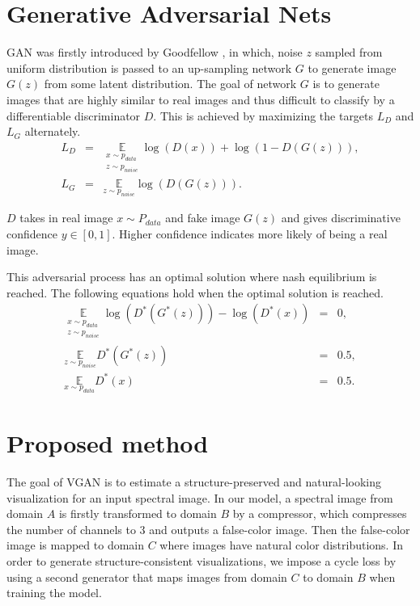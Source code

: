 \documentclass[10pt,conference,a4paper]{IEEEtran}
\begin{document}
\section{Generative Adversarial Nets}
\label{sec:gan}

GAN was firstly introduced by Goodfellow \cite{goodfellow2014generative}, in which, noise $z$ sampled from uniform distribution is passed to an up-sampling network $G$ to generate image $G(z)$ from some latent distribution. The goal of network $G$ is to generate images that are highly similar to real images and thus difficult to classify by a differentiable discriminator $D$. This is achieved by maximizing the targets $L_D$ and $L_G$ alternately.
\begin{eqnarray}
  \label{eq:ld}
  L_D &=& \underset{\substack{ x\sim p_{data} \\ z\sim p_{noise}} }{\mathbb{E}}  \log(D(x)) + \log \left(1-D(G(z)) \right),\\
  \label{eq:lg}
  L_G &=&  \underset{z\sim p_{noise} }{\mathbb{E}} \log(D(G(z))) .
\end{eqnarray}

$D$ takes in real image $x\sim P_{data}$ and fake image $G(z)$ and gives discriminative confidence $y\in [0,1]$. Higher confidence indicates more likely of being a real image.

This adversarial process has an optimal solution where nash equilibrium is reached. The following equations hold when  the optimal solution is reached.
\begin{eqnarray}
  \underset{\substack{ x\sim p_{data} \\ z\sim p_{noise}} }{\mathbb{E}} \log(D^*(G^*(z))) - \log(D^*(x)) &=& 0 ,\\
  \underset{z\sim p_{noise} }{\mathbb{E}} D^*(G^*(z)) &=& 0.5 ,\\
  \underset{x\sim p_{data} }{\mathbb{E}} D^*(x) &=& 0.5 .
\end{eqnarray}


\section{Proposed method}
\label{sec:proposed_method}
The goal of VGAN is to estimate a structure-preserved and natural-looking visualization for an input spectral image.
In our model, a spectral image from domain $A$ is firstly transformed to domain $B$ by a compressor, which compresses the number of channels to 3 and outputs a false-color image.
Then the false-color image is mapped to domain $C$ where images have natural color distributions.
In order to generate structure-consistent visualizations, we impose a cycle loss  by using a second generator that maps images from domain $C$ to domain $B$ when training the model.
\end{document}
